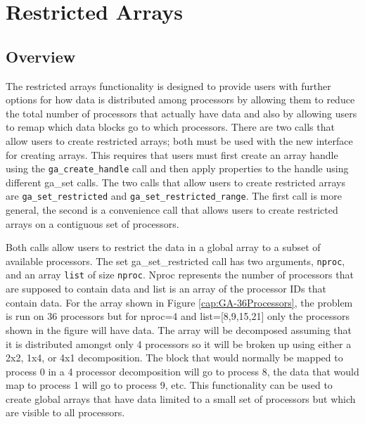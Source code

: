 \chapter{Restricted Arrays}

\section{Overview}

The restricted arrays functionality is designed to provide users with
further options for how data is distributed among processors by allowing
them to reduce the total number of processors that actually have data
and also by allowing users to remap which data blocks go to which
processors. There are two calls that allow users to create restricted
arrays; both must be used with the new interface for creating arrays.
This requires that users must first create an array handle using the
\texttt{ga\_create\_handle} call and then apply properties to the
handle using different ga\_set calls. The two calls that allow users
to create restricted arrays are \texttt{ga\_set\_restricted} and \texttt{ga\_set\_restricted\_range}.
The first call is more general, the second is a convenience call that
allows users to create restricted arrays on a contiguous set of processors. 

Both calls allow users to restrict the data in a global array to a
subset of available processors. The set ga\_set\_restricted call has
two arguments, \texttt{nproc}, and an array \texttt{list} of size
\texttt{nproc}. Nproc represents the number of processors that are
supposed to contain data and list is an array of the processor IDs
that contain data. For the array shown in Figure \ref{cap:GA-36Processors},
the problem is run on 36 processors but for nproc=4 and list={[}8,9,15,21{]}
only the processors shown in the figure will have data. The array
will be decomposed assuming that it is distributed amongst only 4
processors so it will be broken up using either a 2x2, 1x4, or 4x1
decomposition. The block that would normally be mapped to process
0 in a 4 processor decomposition will go to process 8, the data that
would map to process 1 will go to process 9, etc. This functionality
can be used to create global arrays that have data limited to a small
set of processors but which are visible to all processors. 

